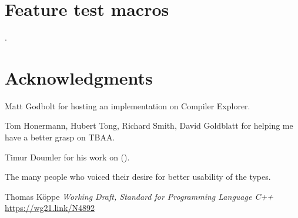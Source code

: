 \documentclass{wg21}
\begin{document}
\section{Feature test macros}

.


\section{Acknowledgments}

Matt Godbolt for hosting an implementation on Compiler Explorer.

Tom Honermann, Hubert Tong, Richard Smith, David Goldblatt for helping me have a better grasp on TBAA.

Timur Doumler for his work on  ().

The many people who voiced their desire for better usability of the  types.





\renewcommand{\section}[2]{}%
\begin{thebibliography}{9}

    Thomas Köppe
    \emph{Working Draft, Standard for Programming Language C++}\newline
    \url{https://wg21.link/N4892}

\end{thebibliography}
\end{document}
